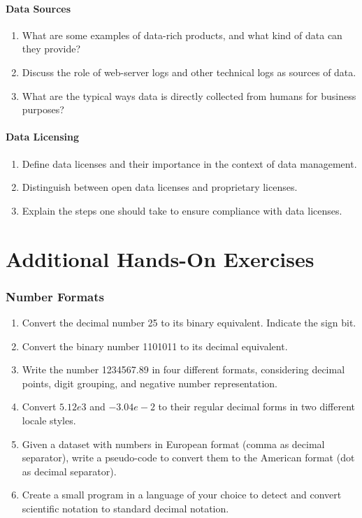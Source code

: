 \paragraph*{Data Sources}
\begin{enumerate}
	\item What are some examples of data-rich products, and what kind of data can they provide?
	\item Discuss the role of web-server logs and other technical logs as sources of data.
	\item What are the typical ways data is directly collected from humans for business purposes?
\end{enumerate}
\paragraph*{Data Licensing}
\begin{enumerate}
	\item Define data licenses and their importance in the context of data management.
	\item Distinguish between open data licenses and proprietary licenses.
	\item Explain the steps one should take to ensure compliance with data licenses.
\end{enumerate}

\section{Additional Hands-On Exercises}

\begin{exerciseboxcomputer}
\subsubsection*{Number Formats}
\begin{enumerate}
	\item Convert the decimal number 25 to its binary equivalent. Indicate the sign bit.
	\item Convert the binary number 1101011 to its decimal equivalent.
	\item Write the number 1234567.89 in four different formats, considering decimal points, digit grouping, and negative number representation.
	\item Convert $5.12e3$ and $-3.04e-2$ to their regular decimal forms in two different locale styles.
	\item Given a dataset with numbers in European format (comma as decimal separator), write a pseudo-code to convert them to the American format (dot as decimal separator).
	\item Create a small program in a language of your choice to detect and convert scientific notation to standard decimal notation.
\end{enumerate}
\end{exerciseboxcomputer}

